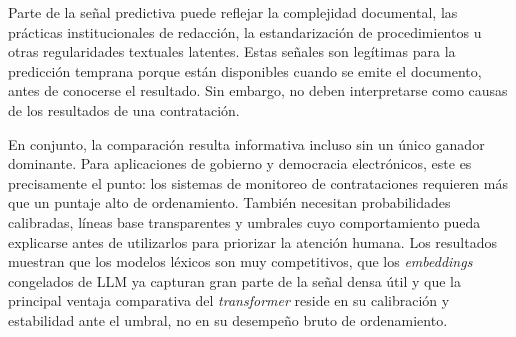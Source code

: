 Parte de la señal predictiva puede reflejar la complejidad documental, las prácticas institucionales de redacción, la estandarización de procedimientos u otras regularidades textuales latentes. Estas señales son legítimas para la predicción temprana porque están disponibles cuando se emite el documento, antes de conocerse el resultado. Sin embargo, no deben interpretarse como causas de los resultados de una contratación.

En conjunto, la comparación resulta informativa incluso sin un único ganador dominante. Para aplicaciones de gobierno y democracia electrónicos, este es precisamente el punto: los sistemas de monitoreo de contrataciones requieren más que un puntaje alto de ordenamiento. También necesitan probabilidades calibradas, líneas base transparentes y umbrales cuyo comportamiento pueda explicarse antes de utilizarlos para priorizar la atención humana. Los resultados muestran que los modelos léxicos son muy competitivos, que los \textit{embeddings} congelados de LLM ya capturan gran parte de la señal densa útil y que la principal ventaja comparativa del \textit{transformer} reside en su calibración y estabilidad ante el umbral, no en su desempeño bruto de ordenamiento.
